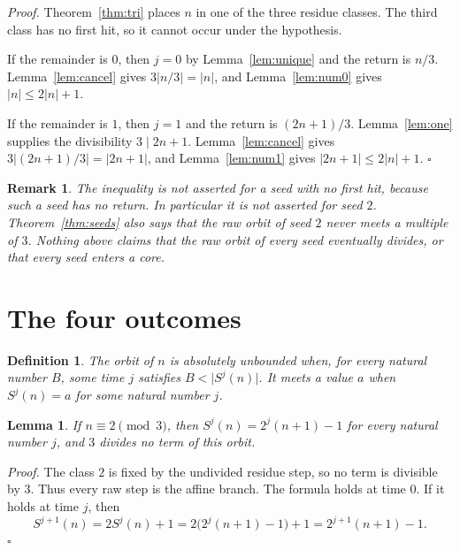 \documentclass[11pt,letterpaper]{article}
\newtheorem{lemma}[theorem]{Lemma}
\newtheorem{definition}[theorem]{Definition}
\newtheorem{remark}[theorem]{Remark}
\newenvironment{proof}{\noindent\textit{Proof.}}{\hfill\(\square\)}
\begin{document}
\begin{proof}
Theorem~\ref{thm:tri} places \(n\) in one of the three residue classes. The third class has no first hit, so it cannot occur under the hypothesis.

If the remainder is \(0\), then \(j=0\) by Lemma~\ref{lem:unique} and the return is \(n/3\). Lemma~\ref{lem:cancel} gives \(3\lvert n/3\rvert=\lvert n\rvert\), and Lemma~\ref{lem:num0} gives \(\lvert n\rvert\le 2\lvert n\rvert+1\).

If the remainder is \(1\), then \(j=1\) and the return is \((2n+1)/3\). Lemma~\ref{lem:one} supplies the divisibility \(3\mid 2n+1\). Lemma~\ref{lem:cancel} gives \(3\lvert(2n+1)/3\rvert=\lvert 2n+1\rvert\), and Lemma~\ref{lem:num1} gives \(\lvert 2n+1\rvert\le 2\lvert n\rvert+1\).
\end{proof}

\begin{remark}
The inequality is not asserted for a seed with no first hit, because such a seed has no return. In particular it is not asserted for seed \(2\). Theorem~\ref{thm:seeds} also says that the raw orbit of seed \(2\) never meets a multiple of \(3\). Nothing above claims that the raw orbit of every seed eventually divides, or that every seed enters a core.
\end{remark}

\section{The four outcomes}

\begin{definition}
The orbit of \(n\) is absolutely unbounded when, for every natural number \(B\), some time \(j\) satisfies \(B<\lvert S^{j}(n)\rvert\). It meets a value \(a\) when \(S^{j}(n)=a\) for some natural number \(j\).
\end{definition}

\begin{lemma}
\label{lem:closed}
If \(n\equiv 2\pmod{3}\), then \(S^{j}(n)=2^{j}(n+1)-1\) for every natural number \(j\), and \(3\) divides no term of this orbit.
\end{lemma}

\begin{proof}
The class \(2\) is fixed by the undivided residue step, so no term is divisible by \(3\). Thus every raw step is the affine branch. The formula holds at time \(0\). If it holds at time \(j\), then
\[
  S^{j+1}(n)=2S^{j}(n)+1=2\bigl(2^{j}(n+1)-1\bigr)+1=2^{j+1}(n+1)-1.
\]
\end{proof}
\end{document}
